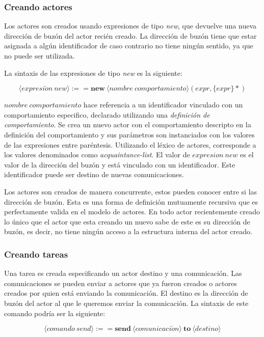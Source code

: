 \subsubsection*{Creando actores}

Los actores son creados usando expresiones de tipo \textit{new}, que devuelve una nueva dirección de buzón del actor recién creado. La dirección de buzón tiene que estar asignada a algún identificador de caso contrario no tiene ningún sentido, ya que no puede ser utilizada.

La sintaxis de las expresiones de tipo \textit{new} es la siguiente:

\[
   \langle expresi\acute{o}n\ new \rangle :== \textbf{new}\ \langle nombre\ comportamiento \rangle (expr, \{expr\}*)  
\]

$nombre\ comportamiento$ hace referencia a un identificador vinculado con un comportamiento especifico, declarado utilizando una \textit{definición de comportamiento}. Se crea un nuevo actor con el comportamiento descripto en la definición del comportamiento y sus parámetros son instanciados con los valores de las expresiones entre paréntesis. Utilizando el léxico de actores, corresponde a los valores denominados como \textit{acquaintance-list}. El valor de $expresion\ new$ es el valor de la dirección del buzón y está vinculado con un identificador. Este identificador puede ser destino de nuevas comunicaciones. 

Los actores son creados de manera concurrente, estos pueden conocer entre si las dirección de buzón. Esta es una forma de definición mutuamente recursiva que es perfectamente valida en el modelo de actores. En todo actor recientemente creado lo único que el actor que esta creando un nuevo sabe de este es su dirección de buzón, es decir, no tiene ningún acceso a la estructura interna del actor creado.

\subsubsection*{Creando tareas}

Una tarea es creada especificando un actor destino y una comunicación. Las comunicaciones se pueden enviar a actores que ya fueron creados o actores creados por quien está enviando la comunicación. El destino es la dirección de buzón del actor al que le queremos enviar la comunicación. La sintaxis de este comando podría ser la siguiente:

\[
  \langle comando\ send \rangle :== \textbf{send}\ \langle comunicaci\acute{o}n \rangle\ \textbf{to}\ \langle destino \rangle
\]

